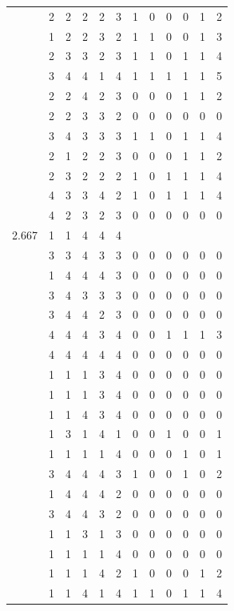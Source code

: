 \documentclass[]{msu-thesis}
\theoremstyle{definition}
\theoremstyle{definition}
\theoremstyle{definition}
\theoremstyle{remark}
\begin{document}
\begin{table}
{\begin{tabular}[t]{rrrrrrrrrrrr}
 & 2 & 2 & 2 & 2 & 3 & 1 & 0 & 0 & 0 & 1 & 2\\
 & 1 & 2 & 2 & 3 & 2 & 1 & 1 & 0 & 0 & 1 & 3\\
 & 2 & 3 & 3 & 2 & 3 & 1 & 1 & 0 & 1 & 1 & 4\\
 & 3 & 4 & 4 & 1 & 4 & 1 & 1 & 1 & 1 & 1 & 5\\
 & 2 & 2 & 4 & 2 & 3 & 0 & 0 & 0 & 1 & 1 & 2\\
 & 2 & 2 & 3 & 3 & 2 & 0 & 0 & 0 & 0 & 0 & 0\\
 & 3 & 4 & 3 & 3 & 3 & 1 & 1 & 0 & 1 & 1 & 4\\
 & 2 & 1 & 2 & 2 & 3 & 0 & 0 & 0 & 1 & 1 & 2\\
 & 2 & 3 & 2 & 2 & 2 & 1 & 0 & 1 & 1 & 1 & 4\\
 & 4 & 3 & 3 & 4 & 2 & 1 & 0 & 1 & 1 & 1 & 4\\
 & 4 & 2 & 3 & 2 & 3 & 0 & 0 & 0 & 0 & 0 & 0\\
2.667 & 1 & 1 & 4 & 4 & 4 &  &  &  &  &  & \\
 & 3 & 3 & 4 & 3 & 3 & 0 & 0 & 0 & 0 & 0 & 0\\
 & 1 & 4 & 4 & 4 & 3 & 0 & 0 & 0 & 0 & 0 & 0\\
 & 3 & 4 & 3 & 3 & 3 & 0 & 0 & 0 & 0 & 0 & 0\\
 & 3 & 4 & 4 & 2 & 3 & 0 & 0 & 0 & 0 & 0 & 0\\
 & 4 & 4 & 4 & 3 & 4 & 0 & 0 & 1 & 1 & 1 & 3\\
 & 4 & 4 & 4 & 4 & 4 & 0 & 0 & 0 & 0 & 0 & 0\\
 & 1 & 1 & 1 & 3 & 4 & 0 & 0 & 0 & 0 & 0 & 0\\
 & 1 & 1 & 1 & 3 & 4 & 0 & 0 & 0 & 0 & 0 & 0\\
 & 1 & 1 & 4 & 3 & 4 & 0 & 0 & 0 & 0 & 0 & 0\\
 & 1 & 3 & 1 & 4 & 1 & 0 & 0 & 1 & 0 & 0 & 1\\
 & 1 & 1 & 1 & 1 & 4 & 0 & 0 & 0 & 1 & 0 & 1\\
 & 3 & 4 & 4 & 4 & 3 & 1 & 0 & 0 & 1 & 0 & 2\\
 & 1 & 4 & 4 & 4 & 2 & 0 & 0 & 0 & 0 & 0 & 0\\
 & 3 & 4 & 4 & 3 & 2 & 0 & 0 & 0 & 0 & 0 & 0\\
 & 1 & 1 & 3 & 1 & 3 & 0 & 0 & 0 & 0 & 0 & 0\\
 & 1 & 1 & 1 & 1 & 4 & 0 & 0 & 0 & 0 & 0 & 0\\
 & 1 & 1 & 1 & 4 & 2 & 1 & 0 & 0 & 0 & 1 & 2\\
 & 1 & 1 & 4 & 1 & 4 & 1 & 1 & 0 & 1 & 1 & 4\\

\end{tabular}}
\end{table}
\end{document}
